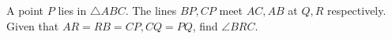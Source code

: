 A point $P$ lies in $\triangle ABC$. The lines $BP,CP$ meet $AC,AB$ at $Q,R$ respectively. Given that $AR=RB=CP, CQ=PQ$, find $\angle BRC$.